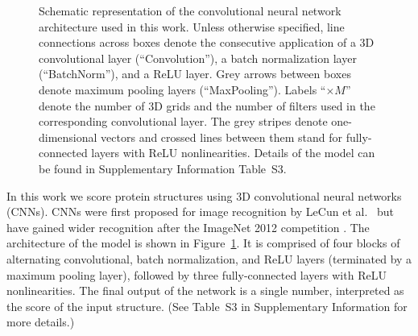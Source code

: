 \documentclass{bioinfo}
\begin{document}
\begin{figure}[t]
    \centerline{}
%
    \vspace{-10pt}
    \caption{Schematic representation of the convolutional neural
    network architecture used in this work. Unless otherwise specified, line connections across
    boxes denote the consecutive application of a 3D convolutional
    layer (``Convolution''), a batch normalization layer
    (``BatchNorm''), and a ReLU layer. Grey arrows between boxes denote
    maximum pooling layers (``MaxPooling''). Labels ``$\times M$''
    denote the number of 3D grids and the number of filters used in the corresponding
    convolutional layer.
    The grey stripes denote
    one-dimensional vectors and crossed lines between them stand for
    fully-connected layers with ReLU nonlinearities. Details of the
    model can be found in Supplementary Information Table~S3.}
    \label{Fig:CNNModel}
\end{figure}

In this work we score protein structures using 3D convolutional neural
networks (CNNs). CNNs were first proposed for image recognition by
LeCun et al.\ \citep{lecun1989backpropagation} but have gained wider
recognition after the ImageNet 2012 competition
\citep{krizhevsky2012imagenet}. The architecture of the model is shown
in Figure~\ref{Fig:CNNModel}.  It is comprised of four blocks of
alternating convolutional, batch normalization, and ReLU layers
(terminated by a maximum pooling layer), followed by three
fully-connected layers with ReLU nonlinearities. The final output of
the network is a single number, interpreted as the score of the input
structure. (See Table~S3 in Supplementary Information for more
details.)
\end{document}
